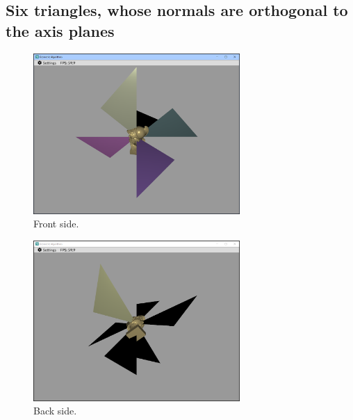 \documentclass[12pt,a4paper,english]{article}
\begin{document}
\subsection{Six triangles, whose normals are orthogonal to the axis planes}

\begin{figure}[H]
    \centering
    \includegraphics[width=0.7\textwidth]{p2c-2}
    \caption[]{Front side.}
    \label{fig:p2c-2}
\end{figure}

\begin{figure}[H]
    \centering
    \includegraphics[width=0.7\textwidth]{p2c-3}
    \caption[]{Back side.}
    \label{fig:p2c-3}
\end{figure}
\end{document}
